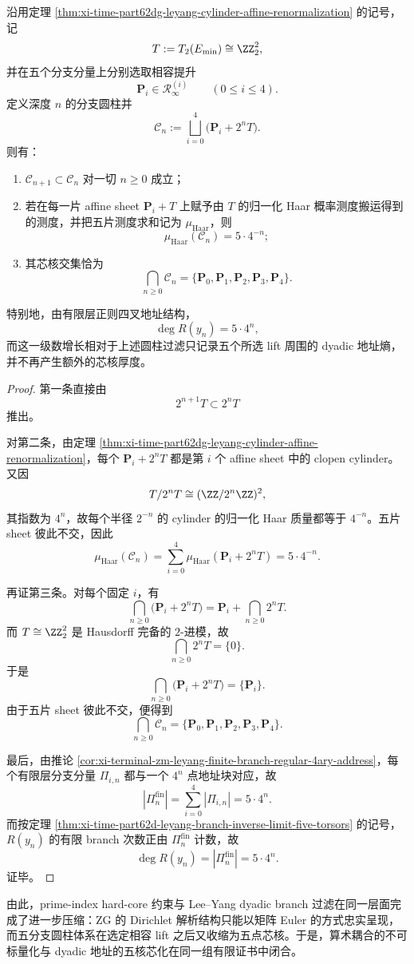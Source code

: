 \begin{theorem}\label{thm:xi-time-part62dgc-leyang-fivecore-dyadic-core-collapse}
沿用定理 \ref{thm:xi-time-part62dg-leyang-cylinder-affine-renormalization} 的记号，记
\[
T:=T_2(E_{\min})\cong \ZZ_2^2,
\]
并在五个分支分量上分别选取相容提升
\[
\mathbf P_i\in \mathcal R_\infty^{(i)}
\qquad (0\le i\le 4).
\]
定义深度 \(n\) 的分支圆柱并
\[
\mathcal C_n
:=
\bigsqcup_{i=0}^{4}\bigl(\mathbf P_i+2^nT\bigr).
\]
则有：
\begin{enumerate}
  \item \(\mathcal C_{n+1}\subset \mathcal C_n\) 对一切 \(n\ge 0\) 成立；
  \item 若在每一片 affine sheet \(\mathbf P_i+T\) 上赋予由 \(T\) 的归一化 Haar 概率测度搬运得到的测度，并把五片测度求和记为 \(\mu_{\mathrm{Haar}}\)，则
  \[
  \mu_{\mathrm{Haar}}(\mathcal C_n)=5\cdot 4^{-n};
  \]
  \item 其芯核交集恰为
  \[
  \bigcap_{n\ge 0}\mathcal C_n=\{\mathbf P_0,\mathbf P_1,\mathbf P_2,\mathbf P_3,\mathbf P_4\}.
  \]
\end{enumerate}
特别地，由有限层正则四叉地址结构，
\[
\deg R(y_n)=5\cdot 4^n,
\]
而这一级数增长相对于上述圆柱过滤只记录五个所选 lift 周围的 dyadic 地址熵，并不再产生额外的芯核厚度。
\end{theorem}
\begin{proof}
第一条直接由
\[
2^{n+1}T\subset 2^nT
\]
推出。

对第二条，由定理 \ref{thm:xi-time-part62dg-leyang-cylinder-affine-renormalization}，每个 \(\mathbf P_i+2^nT\) 都是第 \(i\) 个 affine sheet 中的 clopen cylinder。又因
\[
T/2^nT\cong (\ZZ/2^n\ZZ)^2,
\]
其指数为 \(4^n\)，故每个半径 \(2^{-n}\) 的 cylinder 的归一化 Haar 质量都等于 \(4^{-n}\)。五片 sheet 彼此不交，因此
\[
\mu_{\mathrm{Haar}}(\mathcal C_n)
=
\sum_{i=0}^{4}\mu_{\mathrm{Haar}}(\mathbf P_i+2^nT)
=
5\cdot 4^{-n}.
\]

再证第三条。对每个固定 \(i\)，有
\[
\bigcap_{n\ge 0}\bigl(\mathbf P_i+2^nT\bigr)
=
\mathbf P_i+\bigcap_{n\ge 0}2^nT.
\]
而 \(T\cong\ZZ_2^2\) 是 Hausdorff 完备的 \(2\)-进模，故
\[
\bigcap_{n\ge 0}2^nT=\{0\}.
\]
于是
\[
\bigcap_{n\ge 0}\bigl(\mathbf P_i+2^nT\bigr)=\{\mathbf P_i\}.
\]
由于五片 sheet 彼此不交，便得到
\[
\bigcap_{n\ge 0}\mathcal C_n=\{\mathbf P_0,\mathbf P_1,\mathbf P_2,\mathbf P_3,\mathbf P_4\}.
\]

最后，由推论 \ref{cor:xi-terminal-zm-leyang-finite-branch-regular-4ary-address}，每个有限层分支分量 \(\Pi_{i,n}\) 都与一个 \(4^n\) 点地址块对应，故
\[
|\Pi_n^{\mathrm{fin}}|
=
\sum_{i=0}^{4}|\Pi_{i,n}|
=
5\cdot 4^n.
\]
而按定理 \ref{thm:xi-time-part62d-leyang-branch-inverse-limit-five-torsors} 的记号，\(R(y_n)\) 的有限 branch 次数正由 \(\Pi_n^{\mathrm{fin}}\) 计数，故
\[
\deg R(y_n)=|\Pi_n^{\mathrm{fin}}|=5\cdot 4^n.
\]
证毕。
\end{proof}

\noindent
由此，prime-index hard-core 约束与 Lee--Yang dyadic branch 过滤在同一层面完成了进一步压缩：\(\mathrm{ZG}\) 的 Dirichlet 解析结构只能以矩阵 Euler 的方式忠实呈现，而五分支圆柱体系在选定相容 lift 之后又收缩为五点芯核。于是，算术耦合的不可标量化与 dyadic 地址的五核芯化在同一组有限证书中闭合。

\endinput
